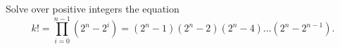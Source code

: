 Solve over positive integers the equation
\[ k! = \prod_{i=0}^{n-1} (2^n-2^i)
  = (2^n-1)(2^n-2)(2^n-4) \dots (2^n-2^{n-1}). \]